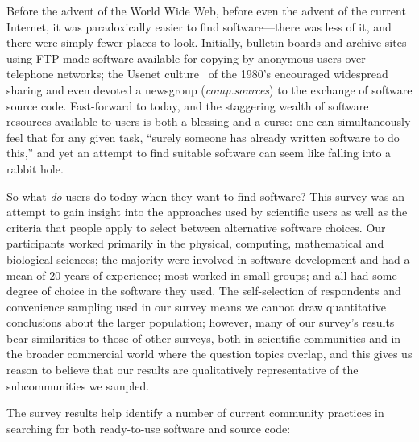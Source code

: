 \documentclass{casicswhitepaper}
\begin{document}
Before the advent of the World Wide Web, before even the advent of the current Internet, it was paradoxically easier to find software---there was less of it, and there were simply fewer places to look.  Initially, bulletin boards and archive sites using FTP made software available for copying by anonymous users over telephone networks; the Usenet culture~\cite{emerson1983usenet} of the 1980's encouraged widespread sharing and even devoted a newsgroup (\emph{comp.sources}) to the exchange of software source code.  Fast-forward to today, and the staggering wealth of software resources available to users is both a blessing and a curse: one can simultaneously feel that for any given task, ``surely someone has already written software to do this,'' and yet an attempt to find suitable software can seem like falling into a rabbit hole.

%
%

So what \emph{do} users do today when they want to find software?  This survey was an attempt to gain insight into the approaches used by scientific users as well as the criteria that people apply to select between alternative software choices.  Our participants worked primarily in the physical, computing, mathematical and biological sciences; the majority were involved in software development and had a mean of 20 years of experience; most worked in small groups; and all had some degree of choice in the software they used.  The self-selection of respondents and convenience sampling used in our survey means we cannot draw quantitative conclusions about the larger population; however, many of our survey's results bear similarities to those of other surveys, both in scientific communities and in the broader commercial world where the question topics overlap, and this gives us reason to believe that our results are qualitatively representative of the subcommunities we sampled.

The survey results help identify a number of current community practices in searching for both ready-to-use software and source code:
\end{document}
